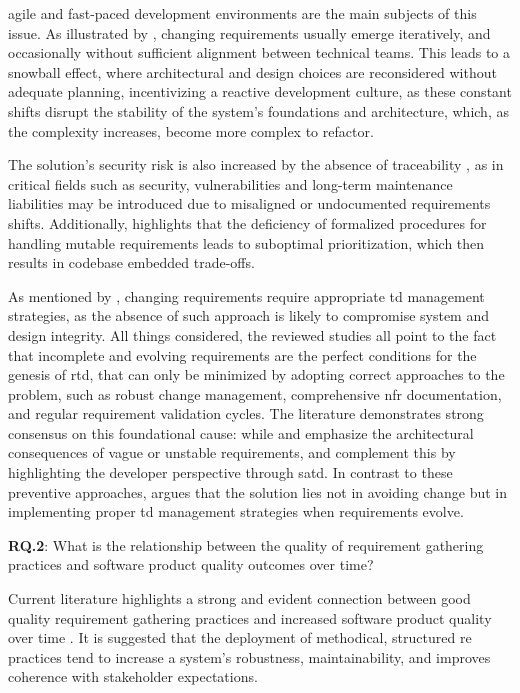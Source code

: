 \documentclass[12pt,reqno, twoside]{amsbook}
\theoremstyle{plain}
\numberwithin{equation}{chapter}
\numberwithin{section}{chapter}
\begin{document}
agile and fast-paced development environments are the main subjects of this issue. As illustrated by \textcite{Gupta2020, Villamizar2018, Vogelsang2020}, changing requirements usually emerge iteratively, and occasionally without sufficient alignment between technical teams. This leads to a snowball effect, where architectural and design choices are reconsidered without adequate planning, incentivizing a reactive development culture, as these constant shifts disrupt the stability of the system's foundations and architecture, which, as the complexity increases, become more complex to refactor.

The solution's security risk is also increased by the absence of traceability \parencite{Herath2025}, as in critical fields such as security, vulnerabilities and long-term maintenance liabilities may be introduced due to misaligned or undocumented requirements shifts.  Additionally, \textcite{Melo2022} highlights that the deficiency of formalized procedures for handling mutable requirements leads to suboptimal prioritization, which then results in codebase embedded trade-offs.

As mentioned by \textcite{Behutiye2022}, changing requirements require appropriate \gls{td} management strategies, as the absence of such approach is likely to compromise system and design integrity. All things considered, the reviewed studies all point to the fact that incomplete and evolving requirements are the perfect conditions for the genesis of \gls{rtd}, that can only be minimized by adopting correct approaches to the problem, such as robust change management, comprehensive \gls{nfr} documentation, and regular requirement validation cycles. The literature demonstrates strong consensus on this foundational cause: while \textcite{Melo2022} and \textcite{Waltersdorfer2020} emphasize the architectural consequences of vague or unstable requirements, \textcite{Farias2020} and \textcite{Wattanakriengkrai2018} complement this by highlighting the developer perspective through \gls{satd}. In contrast to these preventive approaches, \textcite{Behutiye2022} argues that the solution lies not in avoiding change but in implementing proper \gls{td} management strategies when requirements evolve.
\hspace*{\linewidth}\par
\noindent\textbf{RQ.2}: What is the relationship between the quality of requirement gathering practices and software product quality outcomes over time?\par
Current literature highlights a strong and evident connection between good quality requirement gathering practices and increased software product quality over time \parencite{Femmer2019}. It is suggested that the deployment of methodical, structured \gls{re} practices tend to increase a system's robustness, maintainability, and improves coherence with stakeholder expectations.
\end{document}
